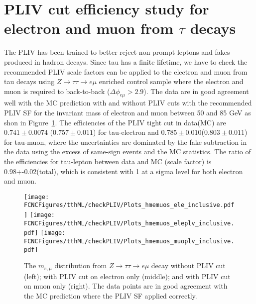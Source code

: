 \section{PLIV cut efficiency study for electron and muon from $\tau$ decays}
\label{sec:CheckPLIV}

The PLIV has been trained to better reject non-prompt leptons and fakes produced in hadron decays. Since tau has a finite lifetime, we have to check the
recommended PLIV scale factors can be applied to the electron and muon from tau decays using $Z\rightarrow \tau\tau\rightarrow e\mu$ enriched control sample
where the electron and muon is required to back-to-back ($\Delta\phi_{e\mu}>2.9$). The data are in good agreement well with the MC prediction with and without
PLIV cuts with the recommended PLIV SF for the invariant mass of electron and muon between 50 and 85 GeV as shon in Figure~\ref{fig:ap9_checkpliv}. The efficiencies of
the PLIV tight cut in data(MC) are $0.741\pm 0.0074$ ($0.757\pm 0.011$) for tau-electron and $0.785\pm 0.010$($0.803\pm 0.011$) for tau-muon, where the uncertainties are
dominated by the fake subtraction in the data using the excess of same-sign events and the MC statistics. The ratio of the efficiencies for tau-lepton between data
and MC (scale factor) is 0.98+-0.02(total), which is consistent with 1 at a sigma level for both electron and muon. 

\begin{figure}[H]
\centering
\texttt{[image: \\FCNCFigures/tthML/checkPLIV/Plots\_hmemuos\_ele\_inclusive.pdf]}
\texttt{[image: \\FCNCFigures/tthML/checkPLIV/Plots\_hmemuos\_eleplv\_inclusive.pdf]}
\texttt{[image: \\FCNCFigures/tthML/checkPLIV/Plots\_hmemuos\_muoplv\_inclusive.pdf]}
\caption{ The $m_{e,\mu}$ distribution from $Z\rightarrow\tau\tau\rightarrow e\mu$ decay without PLIV cut (left); with PLIV cut on electron only (middle); and
  with PLIV cut on muon only (right). The data points are in good agreement with the MC prediction where the PLIV SF applied correctly.}
\label{fig:ap9_checkpliv}
\end{figure}

